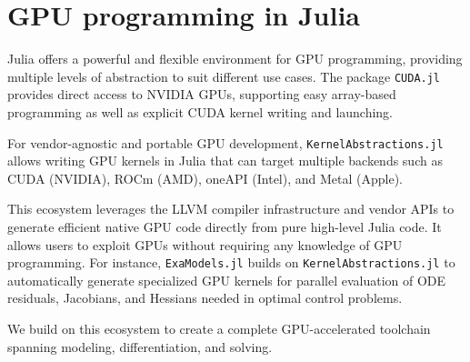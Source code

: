 \documentclass[twoside,leqno,twocolumn]{article}
\begin{document}




\section{GPU programming in Julia}

Julia offers a powerful and flexible environment for GPU programming, providing multiple levels of abstraction to suit different use cases.
The package \texttt{CUDA.jl}~\cite{besard2018juliagpu,besard2019prototyping} provides direct access to NVIDIA GPUs, supporting easy array-based programming as well as explicit CUDA kernel writing and launching.

For vendor-agnostic and portable GPU development, \texttt{KernelAbstractions.jl}~\cite{Churavy_KernelAbstractions_jl} allows writing GPU kernels in Julia that can target multiple backends such as CUDA (NVIDIA), ROCm (AMD), oneAPI (Intel), and Metal (Apple).

This ecosystem leverages the LLVM compiler infrastructure and vendor APIs to generate efficient native GPU code directly from pure high-level Julia code.
It allows users to exploit GPUs without requiring any knowledge of GPU programming.
For instance, \texttt{ExaModels.jl} builds on \texttt{KernelAbstractions.jl} to automatically generate specialized GPU kernels for parallel evaluation of ODE residuals, Jacobians, and Hessians needed in optimal control problems.

We build on this ecosystem to create a complete GPU-accelerated toolchain spanning modeling, differentiation, and solving.
\end{document}
